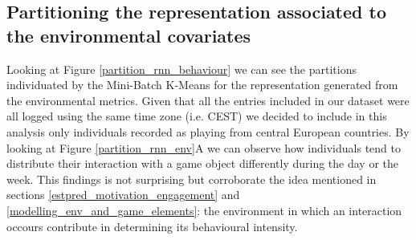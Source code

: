 \subsection{Partitioning the representation associated to the environmental covariates}
\label{partition_environment}
Looking at Figure \ref{partition_rnn_behaviour} we can see the partitions individuated by the Mini-Batch K-Means for the representation generated from the environmental metrics. Given that all the entries included in our dataset were all logged using the same time zone (i.e. CEST) we decided to include in this analysis only individuals recorded as playing from central European countries. By looking at Figure \ref{partition_rnn_env}A we can observe how individuals tend to distribute their interaction with a game object differently during the day or the week. This findings is not surprising but corroborate the idea mentioned in sections \ref{estpred_motivation_engagement} and \ref{modelling_env_and_game_elements}: the environment in which an interaction occours contribute in determining its behavioural intensity. 


